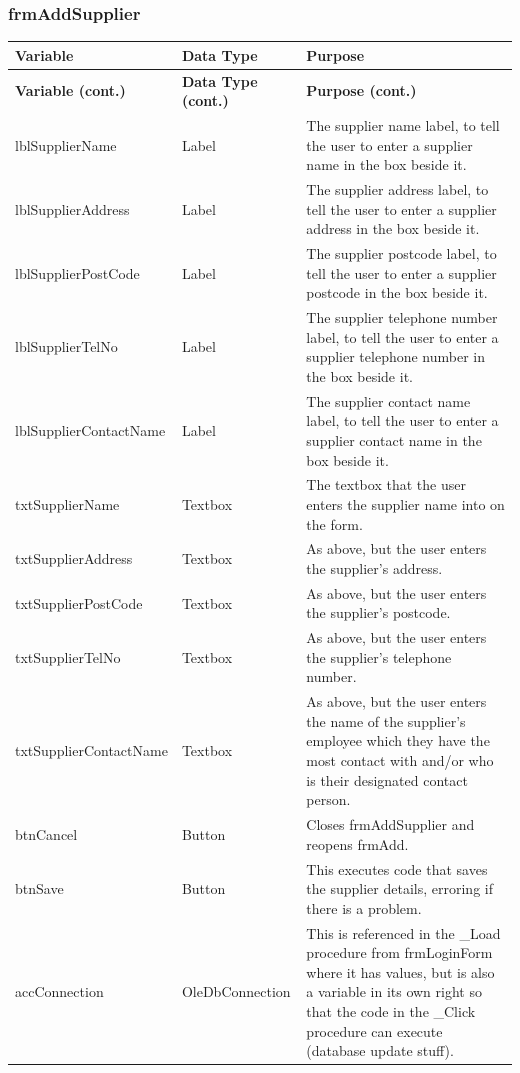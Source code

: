 	\subsubsection{frmAddSupplier}
	\begin{longtable}{ | p{4cm} | p{3cm} | p{10cm} |}
		\hline
		\textbf{Variable} & \textbf{Data Type} & \textbf{Purpose}\\
		\endfirsthead
		\hline
		\textbf{Variable (cont.)} & \textbf{Data Type (cont.)} & \textbf{Purpose (cont.)}\\
		\endhead
		\hline
		lblSupplierName & Label & The supplier name label, to tell the user to enter a supplier name in the box beside it.\\
		\hline
		lblSupplierAddress & Label & The supplier address label, to tell the user to enter a supplier address in the box beside it.\\
		\hline
		lblSupplierPostCode & Label & The supplier postcode label, to tell the user to enter a supplier postcode in the box beside it.\\
		\hline
		lblSupplierTelNo & Label & The supplier telephone number label, to tell the user to enter a supplier telephone number in the box beside it.\\
		\hline
		lblSupplierContactName & Label & The supplier contact name label, to tell the user to enter a supplier contact name in the box beside it.\\
		\hline
		txtSupplierName & Textbox & The textbox that the user enters the supplier name into on the form.\\
		\hline
		txtSupplierAddress & Textbox & As above, but the user enters the supplier's address.\\
		\hline
		txtSupplierPostCode & Textbox & As above, but the user enters the supplier's postcode.\\
		\hline
		txtSupplierTelNo & Textbox & As above, but the user enters the supplier's telephone number.\\
		\hline
		txtSupplierContactName & Textbox & As above, but the user enters the name of the supplier's employee which they have the most contact with and\slash or who is their designated contact person.\\
		\hline
		btnCancel & Button & Closes frmAddSupplier and reopens frmAdd.\\
		\hline
		btnSave & Button & This executes code that saves the supplier details, erroring if there is a problem.\\
		\hline
		accConnection & OleDbConnection & This is referenced in the \_Load procedure from frmLoginForm where it has values, but is also a variable in its own right so that the code in the \_Click procedure can execute (database update stuff).\\

\end{longtable}
